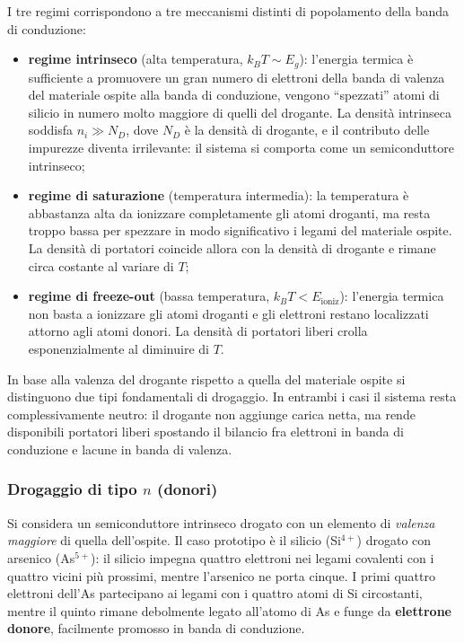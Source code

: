 I tre regimi corrispondono a tre meccanismi distinti di popolamento della banda di conduzione:
\begin{itemize}
    \item \textbf{regime intrinseco} (alta temperatura, \( k_B T \sim E_g \)): l'energia termica è sufficiente a promuovere un gran numero di elettroni della banda di valenza del materiale ospite alla banda di conduzione, vengono ``spezzati'' atomi di silicio in numero molto maggiore di quelli del drogante. La densità intrinseca soddisfa \( n_i \gg N_D \), dove \( N_D \) è la densità di drogante, e il contributo delle impurezze diventa irrilevante: il sistema si comporta come un semiconduttore intrinseco;
    \item \textbf{regime di saturazione} (temperatura intermedia): la temperatura è abbastanza alta da ionizzare completamente gli atomi droganti, ma resta troppo bassa per spezzare in modo significativo i legami del materiale ospite. La densità di portatori coincide allora con la densità di drogante e rimane circa costante al variare di \( T \);
    \item \textbf{regime di freeze-out} (bassa temperatura, \( k_B T < E_{\text{ioniz}} \)): l'energia termica non basta a ionizzare gli atomi droganti e gli elettroni restano localizzati attorno agli atomi donori. La densità di portatori liberi crolla esponenzialmente al diminuire di \( T \).
\end{itemize}

In base alla valenza del drogante rispetto a quella del materiale ospite si distinguono due tipi fondamentali di drogaggio. In entrambi i casi il sistema resta complessivamente neutro: il drogante non aggiunge carica netta, ma rende disponibili portatori liberi spostando il bilancio fra elettroni in banda di conduzione e lacune in banda di valenza.

\subsubsection{Drogaggio di tipo \texorpdfstring{\( n \)}{n} (donori)}

Si considera un semiconduttore intrinseco drogato con un elemento di \emph{valenza maggiore} di quella dell'ospite. Il caso prototipo è il silicio (Si\(^{4+}\)) drogato con arsenico (As\(^{5+}\)): il silicio impegna quattro elettroni nei legami covalenti con i quattro vicini più prossimi, mentre l'arsenico ne porta cinque. I primi quattro elettroni dell'As partecipano ai legami con i quattro atomi di Si circostanti, mentre il quinto rimane debolmente legato all'atomo di As e funge da \textbf{elettrone donore}, facilmente promosso in banda di conduzione.

